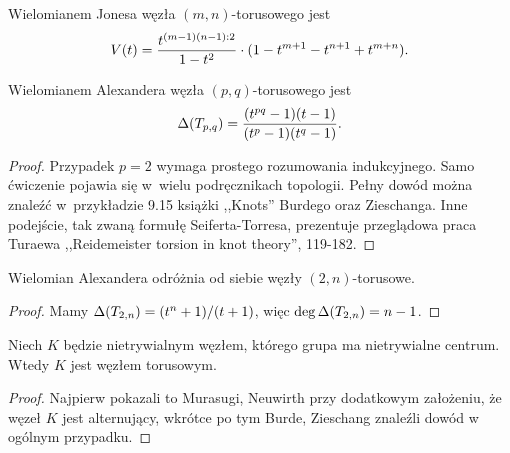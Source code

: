 \begin{proposition}
    Wielomianem Jonesa węzła $(m, n)$-torusowego jest
    \[
        V(t) = \frac {t^{(m-1)(n-1):2}}{1-t^2} \cdot (1 - t^{m+1} - t^{n+1} + t^{m+n}).
    \]
\end{proposition}

\begin{proposition}
    Wielomianem Alexandera węzła $(p,q)$-torusowego jest
    \[
         \Delta(T_{p,q}) = \frac{(t^{pq}-1)(t-1)}{(t^p-1)(t^q-1)}.
    \]
\end{proposition}

\begin{proof}
    Przypadek $p = 2$ wymaga prostego rozumowania indukcyjnego.
    Samo ćwiczenie pojawia się w~wielu podręcznikach topologii.
    Pełny dowód można znaleźć w~przykładzie 9.15 książki ,,Knots'' Burdego oraz Zieschanga.
    Inne podejście, tak zwaną formułę Seiferta-Torresa, prezentuje przeglądowa praca Turaewa ,,Reidemeister torsion in knot theory'', 119-182.
\end{proof}

\begin{corollary}
    Wielomian Alexandera odróżnia od siebie węzły $(2,n)$-torusowe.
\end{corollary}

\begin{proof}
    Mamy $\Delta(T_{2,n}) = (t^n+1) / (t+1)$, więc $\deg \Delta (T_{2,n}) = n - 1$.
\end{proof}

\begin{proposition}
    Niech $K$ będzie nietrywialnym węzłem, którego grupa ma nietrywialne centrum.
    Wtedy $K$ jest węzłem torusowym.
\end{proposition}

\begin{proof}
    Najpierw pokazali to Murasugi, Neuwirth przy dodatkowym założeniu, że węzeł $K$ jest alternujący,
    wkrótce po tym Burde, Zieschang znaleźli dowód w ogólnym przypadku.
\end{proof}

